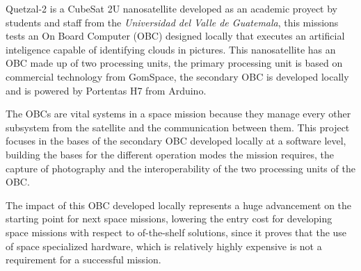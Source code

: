 Quetzal-2 is a CubeSat 2U nanosatellite developed as an academic proyect by students and staff from the \textit{Universidad del Valle de Guatemala}, this missions tests an On Board Computer (OBC) designed locally that executes an artificial inteligence capable of identifying clouds in pictures. This nanosatellite has an OBC made up of two processing units, the primary processing unit is based on commercial technology from GomSpace, the secondary OBC is developed locally and is powered by Portentas H7 from Arduino.

The OBCs are vital systems in a space mission because they manage every other subsystem from the satellite and the communication between them. This project focuses in the bases of the secondary OBC developed locally at a software level, building the bases for the different operation modes the mission requires, the capture of photography and the interoperability of the two processing units of the OBC.

The impact of this OBC developed locally represents a huge advancement on the starting point for next space missions, lowering the entry cost for developing space missions with respect to of-the-shelf solutions, since it proves that the use of space specialized hardware, which is relatively highly expensive is not a requirement for a successful mission.

